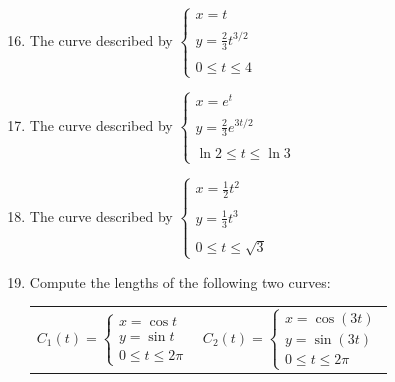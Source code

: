 \documentclass[12pt]{article}
\newif\ifans
\begin{document}

\begin{enumerate}
\setcounter{enumi}{15}

\item The curve described by $\left\{\begin{array}{l}
x=t\\
\\
y=\frac{2}{3}t^{3/2}\\
\\
0 \leq t \leq 4 \end{array}\right.$

\ifans{\fbox{$-\frac{2}{3}+\frac{10\sqrt{5}}{3}$}} \fi

\item The curve described by $\left\{\begin{array}{l}
x=e^t\\
\\
y=\frac{2}{3}e^{3t/2}\\
\\
\ln{2} \leq t \leq \ln{3} \end{array}\right.$

\ifans{\fbox{$-2\sqrt{3}+\frac{16}{3}$; Detailed Solution: \textcolor{blue}{\href{http://www.math.drexel.edu/classes/Calculus/resources/Math122HW/Solutions/122_17_Parametric_17.pdf}{Here}}}} \fi

\item The curve described by $\left\{\begin{array}{l}
x=\frac{1}{2}t^2\\
\\
y=\frac{1}{3}t^3\\
\\
0 \leq t \leq \sqrt{3} \end{array} \right.$

\ifans{\fbox{$\frac{7}{3}$}} \fi

\item Compute the lengths of the following two curves:

\begin{center}
\begin{tabular}{cc}
$C_1(t)=\left\{\begin{array}{l}
x=\cos{t}\\
y=\sin{t}\\
0 \leq t \leq 2\pi \end{array} \right.$ \hspace{0.5 cm}& \hspace{0.5 cm}
$C_2(t)=\left\{\begin{array}{l}
x=\cos{(3t)}\\
y=\sin{(3t)}\\
0 \leq t \leq 2\pi \end{array} \right.$
\end{tabular}
\end{center}


\end{enumerate}
\end{document}
